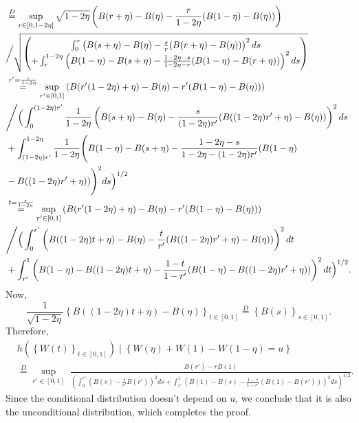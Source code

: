 \documentclass[11pt]{article}
\theoremstyle{plain}
\theoremstyle{definition}
\theoremstyle{remark}
\begin{document}
\begin{appendix}
\begin{align*}
    &\overset{D}{=}\sup_{ r \in [0,1-2\eta]}\sqrt{1-2\eta}\left(B(r+\eta) -B(\eta) -\frac{r}{1-2\eta}(B(1-\eta)-B(\eta))\right)\\
    &\Big/\sqrt{\begin{pmatrix}
        \int_{0}^{r}  \left(B(s+\eta) -B(\eta)-\frac{s}{r}(B(r+\eta)-B(\eta))\right)^2 ds\\
        +\int_{r}^{1-2\eta} \left( B(1-\eta) -B(s+\eta)-\frac{1-2\eta-s}{1-2\eta-r}(B(1-\eta)-B(r+\eta))\right)^2ds
    \end{pmatrix}}\allowdisplaybreaks\\
    &\overset{r'=\frac{r}{1-2\eta}}{=}\sup_{ r' \in [0,1]}\left(B(r'(1-2\eta)+\eta) -B(\eta) -r'(B(1-\eta)-B(\eta))\right)\\
    &\Bigg/\Big(\int_{0}^{(1-2\eta)r'}  \frac{1}{1-2\eta}\left(B(s+\eta) -B(\eta)-\frac{s}{(1-2\eta)r'}(B((1-2\eta)r'+\eta)-B(\eta))\right)^2 ds\\
    &+\int_{(1-2\eta)r'}^{1-2\eta} \frac{1}{1-2\eta}\Bigg( B(1-\eta) -B(s+\eta)-\frac{1-2\eta-s}{1-2\eta-(1-2\eta)r'}(B(1-\eta)\\
    &-B((1-2\eta)r'+\eta))\Bigg)^2ds\Big)^{1/2}\\
    &\overset{t=\frac{s}{1-2\eta}}{=}\sup_{ r' \in [0,1]}\left(B(r'(1-2\eta)+\eta) -B(\eta) -r'(B(1-\eta)-B(\eta))\right)\\
    &\Bigg/\Big(\int_{0}^{r'}  \left(B((1-2\eta)t+\eta) -B(\eta)-\frac{t}{r'}(B((1-2\eta)r'+\eta)-B(\eta))\right)^2 dt\\
    &+\int_{r'}^{1} \left( B(1-\eta) -B((1-2\eta)t+\eta)-\frac{1-t}{1-r'}(B(1-\eta)-B((1-2\eta)r'+\eta))\right)^2dt\Big)^{1/2}.\\
\end{align*}
Now, 
$$\frac{1}{\sqrt{1-2\eta}}\left\{B((1-2\eta)t+\eta) -B(\eta)\right\}_{t\in [0,1]}\overset{D}{=}\left\{B(s)\right\}_{s \in [0,1]}.$$
Therefore,
\begin{align*}
     &h\left(\left\{W(t)\right\}_{t \in [0,1]}\right) \mid \left\{W(\eta)+W(1)-W(1-\eta)=u\right\}\\
     &\overset{D}{=}\sup_{r'\in[0,1]}\;\frac{B(r')-rB(1)}{\left(\int_{0}^{r'}(B(s)-\frac{s}{r'}B(r'))^2 ds+\int_{r'}^{1}(B(1)-B(s)-\frac{1-s}{1-r'}(B(1)-B(r')))^2 ds\right)^{1/2}}.
\end{align*}
Since the conditional distribution doesn't depend on $u$, we conclude that it is also  the unconditional distribution, which completes the proof.

\end{appendix}
\end{document}
